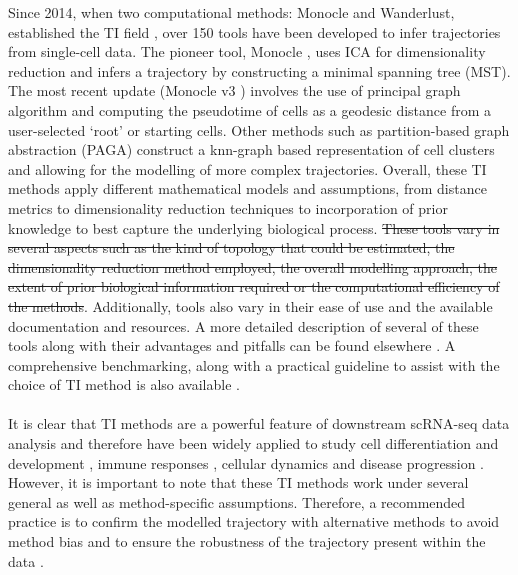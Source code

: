 Since 2014, when two computational methods: Monocle and Wanderlust, established the TI field \textbf{\cite{lueckenmalte_d_current_2019}}, over 150 tools have been developed to infer trajectories from single-cell data. The pioneer tool, Monocle \textbf{\cite{trapnell_pseudo-temporal_2014}}, uses ICA for dimensionality reduction and infers a trajectory by constructing a minimal spanning tree (MST). The most recent update (Monocle v3 \textbf{\cite{cao_single-cell_2019}}) involves the use of principal graph algorithm and computing the pseudotime of cells as a geodesic distance from a user-selected ‘root’ or starting cells. Other methods such as partition-based graph abstraction (PAGA) \textbf{\cite{wolf_paga_2019}} construct a knn-graph based representation of cell clusters and allowing for the modelling of more complex trajectories. Overall, these TI methods apply different mathematical models and assumptions, from distance metrics to dimensionality reduction techniques to incorporation of prior knowledge to best capture the underlying biological process. \st{These tools vary in several aspects such as the kind of topology that could be estimated, the dimensionality reduction method employed, the overall modelling approach, the extent of prior biological information required or the computational efficiency of the methods}. Additionally, tools also vary in their ease of use and the available documentation and resources. A more detailed description of several of these tools along with their advantages and pitfalls can be found elsewhere \textbf{\cite{ding_temporal_2022,deconinck_recent_2021,cannoodt_computational_2016,saelens_comparison_2019}}. A comprehensive benchmarking, along with a practical guideline to assist with the choice of TI method is also available \textbf{\cite{saelens_comparison_2019}}.\\\\
It is clear that TI methods are a powerful feature of downstream scRNA-seq data analysis and therefore have been widely applied to study cell differentiation and development \textbf{\cite{cao_single-cell_2019,sun_time-course_2021,herault_single-cell_2021,li_single-cell_2021,meistermann_integrated_2021,liang_temporal_2022,anderson_single-cell_2023}}, immune responses \textbf{\cite{xu_differential_2020,carpen_single-cell_2022,nguyen_trajectory_2022,luo_multidimensional_2022,xiang_single-cell_2023}}, cellular dynamics and disease progression \textbf{\cite{xin_pseudotime_2018,pang_single-cell_2019,pagliaro_single-cell_2020,bao_pseudotime_2021,dong_single-cell_2021,jansky_single-cell_2021,bazyari_deciphering_2023}}. However, it is important to note that these TI methods work under several general as well as method-specific assumptions. Therefore, a recommended practice is to  confirm the modelled trajectory with alternative methods to avoid method bias and to ensure the robustness of the trajectory present within the data \textbf{\cite{lueckenmalte_d_current_2019}}.
\label{sec:sc_tpi}

